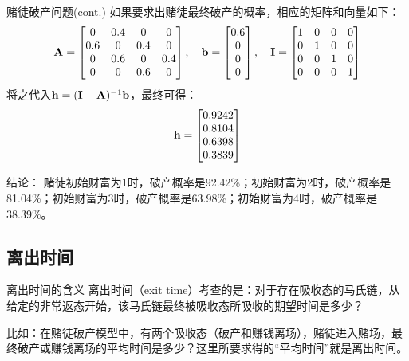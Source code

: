 \documentclass[t]{beamer}
\begin{document}
\begin{frame}{赌徒破产问题(cont.)}\small
    如果要求出赌徒最终破产的概率，相应的矩阵和向量如下：
    \[{\bf A}=\begin{bmatrix}
    0 & 0.4 & 0 & 0\\
     0.6 & 0 & 0.4 & 0\\
     0 & 0.6 & 0 & 0.4 \\
    0 & 0 & 0.6 & 0
    \end{bmatrix},\quad {\bf b}=\begin{bmatrix}
    0.6\\ 0\\0\\0
    \end{bmatrix},\quad {\bf I}=\begin{bmatrix}
    1&0&0&0\\
    0&1&0&0\\
    0&0&1&0\\
    0&0&0&1\\
    \end{bmatrix}  \]
    将之代入${\bf h}=({\bf I}-{\bf A})^{-1}{\bf b}$，最终可得：
    \[{\bf h}=\begin{bmatrix}
    0.9242\\
    0.8104\\
    0.6398\\
    0.3839\\
    \end{bmatrix} \]

    \begin{block}{结论：}
        赌徒初始财富为1时，破产概率是92.42\%；初始财富为2时，破产概率是81.04\%；初始财富为3时，破产概率是63.98\%；初始财富为4时，破产概率是38.39\%。
    \end{block}
\end{frame}


\subsection{离出时间}
\begin{frame}{离出时间的含义}
    离出时间（exit time）考查的是：对于存在吸收态的马氏链，从给定的非常返态开始，该马氏链最终被吸收态所吸收的{期望时间}是多少？

    比如：在赌徒破产模型中，有两个吸收态（破产和赚钱离场），赌徒进入赌场，最终破产或赚钱离场的平均时间是多少？这里所要求得的“平均时间”就是离出时间。
\end{frame}
\end{document}
